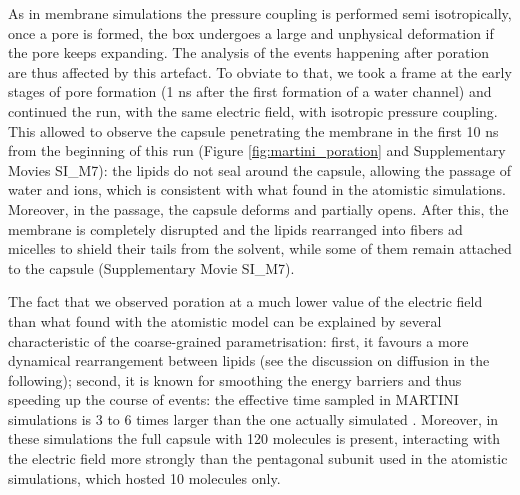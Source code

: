 As in membrane simulations the pressure coupling is performed semi isotropically, once a pore is formed, the box undergoes a large and unphysical deformation if the pore keeps expanding. The analysis of the events happening after poration are thus affected by this artefact.
%
To obviate to that, we took a frame at the early stages of pore formation (1 ns after the first formation of a water channel) and continued the run, with the same electric field, with isotropic pressure coupling. This allowed to observe the capsule penetrating the membrane in the first 10 ns from the beginning of this run (Figure \ref{fig:martini_poration} and Supplementary Movies SI\_M7): the lipids do not seal around the capsule, allowing the passage of water and ions, which is consistent with what found in the atomistic simulations. Moreover, in the passage, the capsule deforms and partially opens.
%
After this, the membrane is completely disrupted and the lipids rearranged into fibers ad micelles to shield their tails from the solvent, while some of them remain attached to the capsule (Supplementary Movie SI\_M7).

The fact that we observed poration at a much lower value of the electric field than what found with the atomistic model can be explained by several characteristic of the coarse-grained parametrisation: first, it favours a more dynamical rearrangement between lipids (see the discussion on diffusion in the following); second, it is known for smoothing the energy barriers and thus speeding up the course of events: the effective time sampled in MARTINI simulations is 3 to 6 times larger than the one actually simulated \citep{SiewertJ.Marrink2003}. Moreover, in these simulations the full capsule with 120 molecules is present, interacting with the electric field more strongly than the pentagonal subunit used in the atomistic simulations, which hosted 10 molecules only.

